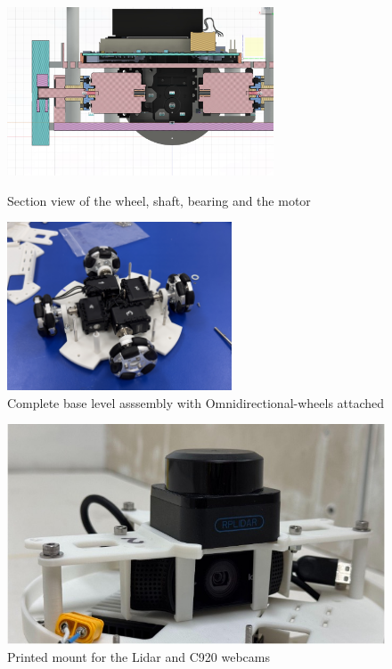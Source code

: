 \begin{figure}[!htb]
    \begin{minipage}{0.41\textwidth}
        \includegraphics[height=5cm]{assets/images/hardware/cad-robot-shaft-section.png}
        \caption{Section view of the wheel, shaft, bearing and the motor}
        \label{fig:cad-shaft-section}
    \end{minipage}
    \hspace{0.1\textwidth} %
    \begin{minipage}{0.41\textwidth}
        \includegraphics[height=5cm]{assets/images/hardware/IMG_8287.jpeg}
        \caption{Complete base level asssembly with Omnidirectional-wheels attached}
        \label{fig:complete-base-assembly}
    \end{minipage}
\end{figure}

\begin{figure}[H]
    \centering
    \includegraphics[width=0.65\linewidth]{assets/images/hardware/irl-cameramount.jpg}
    \caption{Printed mount for the Lidar and C920 webcams}
    \label{fig:irl-snap-fit}
\end{figure}


